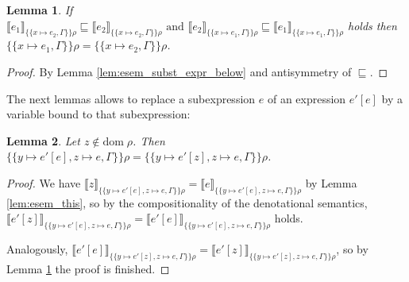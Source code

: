 \documentclass[twopage]{scrartcl}
\newtheorem{lemma}{Lemma}
\theoremstyle{nonumberbreak}
\newtheorem{proof}{Proof}
\newcommand{\dom}[1]{\text{dom}\;#1}
\newcommand{\dsem}[2]{\llbracket #1 \rrbracket_{#2}}
\newcommand{\esem}[1]{\{\!\!\!\{#1\}\!\!\!\}}
\begin{document}
\begin{lemma}
If
$\dsem{e_1}{\esem{x \mapsto e_2, \Gamma}\rho} \sqsubseteq \dsem{e_2}{\esem{x \mapsto e_2, \Gamma}\rho}
\text{ and }
\dsem{e_2}{\esem{x \mapsto e_1, \Gamma}\rho} \sqsubseteq \dsem{e_1}{\esem{x \mapsto e_1, \Gamma}\rho}
$
holds then $\esem{x \mapsto e_1, \Gamma}\rho = \esem{x \mapsto e_2, \Gamma}\rho$.
\label{lem:esem_subst_expr}
\end{lemma}

\begin{proof}
By Lemma \ref{lem:esem_subst_expr_below} and antisymmetry of $\sqsubseteq$.
\end{proof}

The next lemmas allows to replace a subexpression $e$ of an expression $e'[e]$ by a variable bound to that subexpression:

\begin{lemma}
Let $z \notin \dom \rho$. Then $\esem{y \mapsto e'[e], z \mapsto e, \Gamma}\rho = \esem{y \mapsto e'[z], z \mapsto e, \Gamma}\rho$.
\label{lem:exp_var_subst}
\label{lem:var_var_subst}
\end{lemma}

\begin{proof}
We have
$\dsem{z}{\esem{y \mapsto e'[e], z \mapsto e, \Gamma}\rho} = \dsem{e}{\esem{y \mapsto e'[e], z \mapsto e, \Gamma}\rho}$ by Lemma \ref{lem:esem_this}, so by the compositionality of the denotational semantics, $\dsem{e'[z]}{{\esem{y \mapsto e'[e], z \mapsto e, \Gamma}\rho}} = \dsem{e'[e]}{{\esem{y \mapsto e'[e], z \mapsto e, \Gamma}\rho}}$ holds.

Analogously, $\dsem{e'[e]}{{\esem{y \mapsto e'[z], z \mapsto e, \Gamma}\rho}} = \dsem{e'[z]}{{\esem{y \mapsto e'[z], z \mapsto e, \Gamma}\rho}}$, so by Lemma \ref{lem:esem_subst_expr} the proof is finished.
\end{proof}
\end{document}

